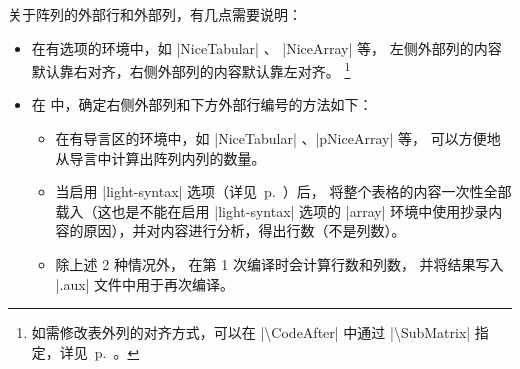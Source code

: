 \documentclass[dvipsnames]{article}%
\begin{document}
\bigskip
关于阵列的外部行和外部列，有几点需要说明：
\begin{itemize}[beginpenalty=10000]
\item 在有选项的环境中，如 |{NiceTabular}| 、 |{NiceArray}| 等，
左侧外部列的内容默认靠右对齐，右侧外部列的内容默认靠左对齐。
\footnote{如需修改表外列的对齐方式，可以在 |\textbackslash CodeAfter| 中通过  |\textbackslash SubMatrix| 指定，详见~p.~\pageref{sub-matrix}。}
\item 在 中，确定右侧外部列和下方外部行编号的方法如下：
\begin{itemize}
\item 在有导言区的环境中，如 |{NiceTabular}| 、|{pNiceArray}| 等，
可以方便地从导言中计算出阵列内列的数量。

\item 当启用 |light-syntax| 选项（详见~p.~\pageref{light-syntax}）后，
 将整个表格的内容一次性全部载入（这也是不能在启用 |light-syntax| 选项的 |array| 环境中使用抄录内容的原因），并对内容进行分析，得出行数（不是列数）。

\item 除上述 2 种情况外，  在第 1 次编译时会计算行数和列数，
并将结果写入 |.aux| 文件中用于再次编译。


\end{itemize}
\end{itemize}
\end{document}
